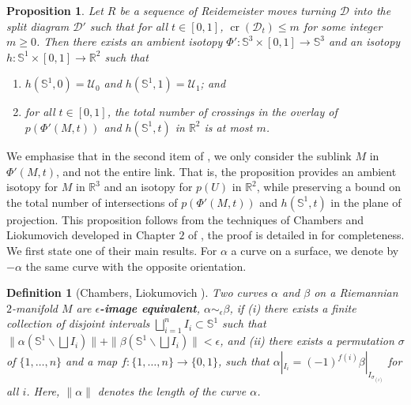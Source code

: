 \documentclass{article}
\newcommand{\R}{\mathbb{R}}
\newcommand{\Sp}{\mathbb{S}}
\newcommand{\cross}{\operatorname{cr}}
\newtheorem{definition}[theorem]{Definition}
\newtheorem{proposition}[theorem]{Proposition}
\begin{document}
\begin{proposition}\label{prop_iso_U}
Let $R$ be a sequence of Reidemeister moves turning $\mathcal{D}$ into the split diagram $\mathcal{D}'$ such that for all $t \in [0,1]$,  $\cross(\mathcal{D}_t)\leq m$ for some integer $m \geq 0$. Then there exists an ambient isotopy $\Phi' : \Sp^3 \times [0,1] \to \Sp^3$ and an isotopy $h:\Sp^1 \times [0,1] \rightarrow \R^2$ such that

\begin{enumerate}
    \item $h(\Sp^1,0)=\mathcal{U}_0$ and $h(\Sp^1,1)=\mathcal{U}_1$; and
    \item for all $t \in [0,1]$, the total number of crossings in the overlay of $p(\Phi'(M,t))$ and $h(\Sp^1,t)$ in $\R^2$ is at most $m$.
\end{enumerate}
\end{proposition}

We emphasise that in the second item of , we only consider the sublink $M$ in $\Phi'(M,t)$, and not the entire link. That is, the proposition provides an ambient isotopy for $M$ in $\R^3$ and an isotopy for $p(U)$ in $\R^2$, while preserving a bound on the total number of intersections of $p(\Phi'(M,t))$ and $h(\Sp^1,t)$ in the plane of projection. This proposition follows from the techniques of Chambers and Liokumovich developed in Chapter $2$ of \cite{Chambers_homo-isotopy}, the proof is detailed in  for completeness. We first state one of their main results. For $\alpha$ a curve on a surface, we denote by $-\alpha$ the same curve with the opposite orientation.

\begin{definition}[Chambers, Liokumovich {\cite[Definition 1.3]{Chambers_homo-isotopy}}]
\label{def:Chambers_homo-isotopy}
Two curves $\alpha$ and $\beta$ on a Riemannian $2$-manifold $M$ are \textbf{$\epsilon$-image equivalent}, $\alpha \sim_\epsilon \beta$, if (i) there exists a finite collection of disjoint intervals $\bigsqcup_{i=1}^{n} I_i \subset \Sp^1$ such that $\|\alpha (\Sp^1 \smallsetminus \bigsqcup I_i)\| + \| \beta (\Sp^1 \smallsetminus \bigsqcup I_i) \| < \epsilon$, and (ii) there exists a permutation $\sigma$ of $\{1, \ldots, n\}$ and a map $f : \{1, \ldots, n\} \rightarrow \{0,1\}$, such that $\alpha |_{I_i} = {(-1)}^{f(i)} \beta|_{I_{\sigma_{(i)}}}$ for all $i$. Here, $\| \alpha \|$ denotes the length of the curve $\alpha$.
\end{definition}
\end{document}

